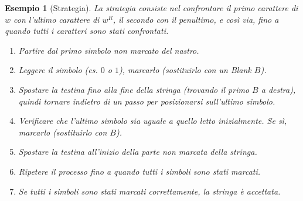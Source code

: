 \documentclass[a4paper]{article}
\newtheorem{example}{Esempio}
\begin{document}
\begin{example}[Strategia]
La strategia consiste nel confrontare il primo carattere di $w$ con l'ultimo carattere di $w^R$, il secondo con il penultimo, e così via, fino a quando tutti i caratteri sono stati confrontati.
\begin{enumerate}
    \item Partire dal primo simbolo non marcato del nastro.
    \item Leggere il simbolo (es. $0$ o $1$), marcarlo (sostituirlo con un Blank $B$).
    \item Spostare la testina fino alla fine della stringa (trovando il primo $B$ a destra), quindi tornare indietro di un passo per posizionarsi sull'ultimo simbolo.
    \item Verificare che l'ultimo simbolo sia uguale a quello letto inizialmente. Se sì, marcarlo (sostituirlo con $B$).
    \item Spostare la testina all'inizio della parte non marcata della stringa.
    \item Ripetere il processo fino a quando tutti i simboli sono stati marcati.
    \item Se tutti i simboli sono stati marcati correttamente, la stringa è accettata.
\end{enumerate}
\end{example}

\end{document}
